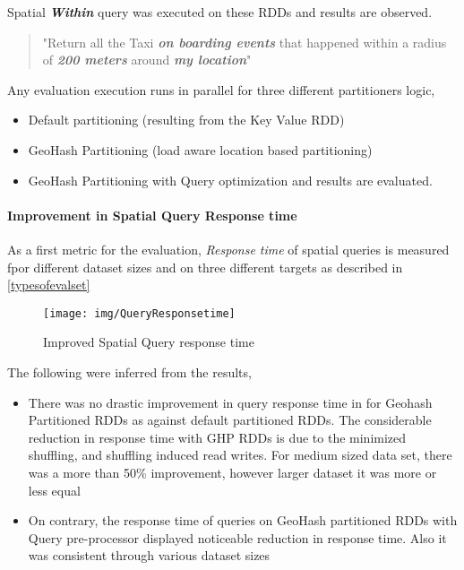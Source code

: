 \documentclass[article,type=msc,colorback,12pt,accentcolor=tud1d]{tudthesis}
\begin{document}
		  Spatial \textbf{\textit{Within}} query was executed on these RDDs and results are observed. 
		  
		  \begin{quote}
		  	"Return all the Taxi \textbf{\textit{on boarding events}} that happened within a radius of \textbf{\textit{200 meters}} around \textbf{\textit{my location}}"
		  \end{quote}
		  
		  Any evaluation execution runs in parallel for three different partitioners logic,
		  \begin{itemize} 
		  	\label{typesofevalset}
		  	\item Default partitioning (resulting from the Key Value RDD)
		  \item GeoHash Partitioning (load aware location based partitioning)
		  \item GeoHash Partitioning with Query optimization
		  and results are evaluated. 
		  
		  \end{itemize}
		  
		  \clearpage
			  \paragraph{Improvement in Spatial Query Response time}
		  	  
		  	  As a first metric for the evaluation, \textit{Response time }of spatial queries is measured fpor different dataset sizes and on three different targets as described in \ref{typesofevalset} 
		  	  
				\begin{figure}[h]
				\centering
				\texttt{[image: img/QueryResponsetime]}
				\caption{Improved Spatial Query response time}
				\label{fig:queryresponsetime}
				\end{figure}
				
				The following were inferred from the results, 
				\begin{itemize}
					\item There was no drastic improvement in query response time in for Geohash Partitioned RDDs as against default partitioned RDDs. The considerable reduction in response time with GHP RDDs is due to the minimized shuffling, and shuffling induced read writes. For medium sized data set, there was a more than 50\% improvement, however larger dataset it was more or less equal
					\item On contrary, the response time of queries on GeoHash partitioned RDDs with Query pre-processor displayed noticeable reduction in response time. Also it was consistent through various dataset sizes
				\end{itemize}
				
\end{document}
